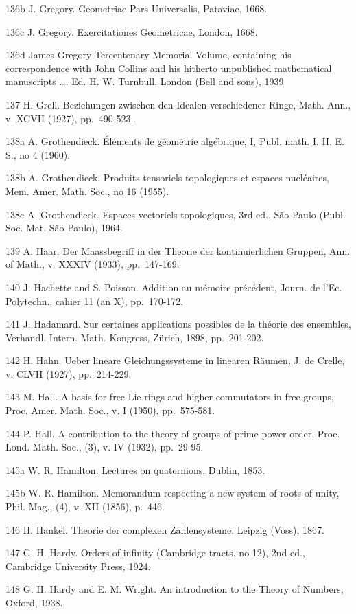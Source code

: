 136b J. Gregory. Geometriae Pars Universalis, Pataviae, 1668.

136c J. Gregory. Exercitationes Geometricae, London, 1668.

136d James Gregory Tercentenary Memorial Volume, containing his correspondence with John Collins and his hitherto unpublished mathematical manuscripts \ldots. Ed. H. W. Turnbull, London (Bell and sons), 1939.

137 H. Grell. Beziehungen zwischen den Idealen verschiedener Ringe, Math. Ann., v. XCVII (1927), pp.~490-523.

138a A. Grothendieck. Éléments de géométrie algébrique, I, Publ. math. I. H. E. S., no 4 (1960).

138b A. Grothendieck. Produits tensoriels topologiques et espaces nucléaires, Mem. Amer. Math. Soc., no 16 (1955).

138c A. Grothendieck. Espaces vectoriels topologiques, 3rd ed., São Paulo (Publ. Soc. Mat. São Paulo), 1964.

139 A. Haar. Der Maassbegriff in der Theorie der kontinuierlichen Gruppen, Ann. of Math., v. XXXIV (1933), pp.~147-169.

140 J. Hachette and S. Poisson. Addition au mémoire précédent, Journ. de l'Ec. Polytechn., cahier 11 (an X), pp.~170-172.

141 J. Hadamard. Sur certaines applications possibles de la théorie des ensembles, Verhandl. Intern. Math. Kongress, Zürich, 1898, pp.~201-202.

142 H. Hahn. Ueber lineare Gleichungssysteme in linearen Räumen, J. de Crelle, v. CLVII (1927), pp.~214-229.

143 M. Hall. A basis for free Lie rings and higher commutators in free groups, Proc. Amer. Math. Soc., v. I (1950), pp.~575-581.

144 P. Hall. A contribution to the theory of groups of prime power order, Proc. Lond. Math. Soc., (3), v. IV (1932), pp.~29-95.

145a W. R. Hamilton. Lectures on quaternions, Dublin, 1853.

145b W. R. Hamilton. Memorandum respecting a new system of roots of unity, Phil. Mag., (4), v. XII (1856), p.~446.

146 H. Hankel. Theorie der complexen Zahlensysteme, Leipzig (Voss), 1867.

147 G. H. Hardy. Orders of infinity (Cambridge tracts, no 12), 2nd ed., Cambridge University Press, 1924.

148 G. H. Hardy and E. M. Wright. An introduction to the Theory of Numbers, Oxford, 1938.

